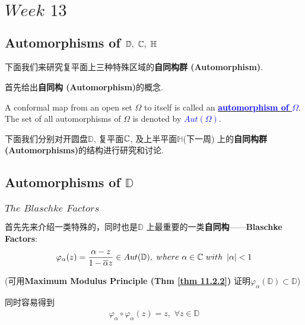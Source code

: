 \ifx\allfiles\undefined


	\else
	\fi

\chapter{$Week \,\, 13$}
\section{Automorphisms of $\mathbb{D} , \,\, \mathbb{C} , \,\, \mathbb{H}$}
	下面我们来研究复平面上三种特殊区域的\textbf{自同构群 (Automorphism)}. 
	
	\vspace*{1em}
	首先给出\textbf{自同构 (Automorphism)}的概念.
	\begin{defn}\label{def 13.1.1}
		A conformal map from an open set $\Omega$ to itself is called an \underline{\textcolor{blue}{\textbf{automorphism of $\Omega$}}}. The set of all automorphisms of $\Omega$ is denoted by \underline{\textcolor{blue}{\textbf{$Aut(\Omega)$}}}.
	\end{defn}
	
	\vspace*{6em}
	下面我们分别对开圆盘$\mathbb{D}$, 复平面$\mathbb{C}$, 及上半平面$\mathbb{H}$(下一周) 上的\textbf{自同构群 (Automorphisms)}的结构进行研究和讨论.
	
\newpage
\section{Automorphisms of $\mathbb{D}$}
\subsection{$The \,\, Blaschke \,\, Factors$}
	首先先来介绍一类特殊的，同时也是$\mathbb{D}$ 上最重要的一类\textbf{自同构}——\textbf{Blaschke Factors}:
	\begin{align}
		\varphi_{\alpha}(z) = \frac{\alpha - z}{1 - \overline{\alpha} z} \in Aut(\mathbb{D}), \,\, where \,\, \alpha \in \mathbb{C} \,\, with \,\, \left| \alpha \right| < 1
	\end{align}
	\begin{center}
		(可用\textbf{Maximum Modulus Principle (Thm \ref{thm 11.2.2})} 证明$\varphi_\alpha (\mathbb{D}) \subset \mathbb{D}$)
	\end{center}
	同时容易得到
	\begin{align}
		\varphi_\alpha \circ \varphi_\alpha (z) = z , \,\, \forall z \in \mathbb{D}
	\end{align}

